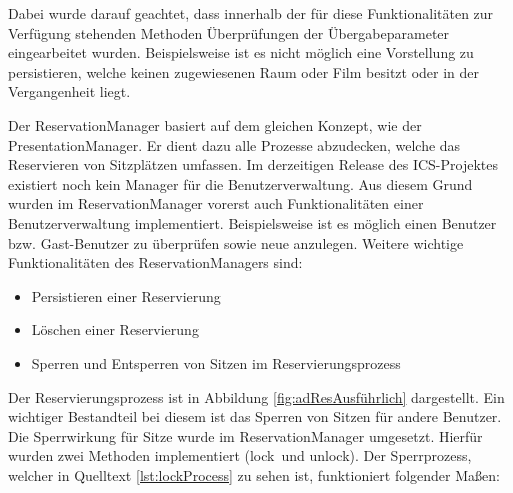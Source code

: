 	Dabei wurde darauf geachtet, dass innerhalb der für diese Funktionalitäten zur Verfügung stehenden Methoden Überprüfungen der Übergabeparameter eingearbeitet wurden. Beispielsweise ist es nicht möglich eine Vorstellung zu persistieren, welche keinen zugewiesenen Raum oder Film besitzt oder in der Vergangenheit liegt.
	
	Der ReservationManager basiert auf dem gleichen Konzept, wie der PresentationManager. Er dient dazu alle Prozesse abzudecken, welche das Reservieren von Sitzplätzen umfassen. Im derzeitigen Release des \ac{ICS}-Projektes existiert noch kein Manager für die Benutzerverwaltung. Aus diesem Grund wurden im ReservationManager vorerst auch Funktionalitäten einer Benutzerverwaltung implementiert. Beispielsweise ist es möglich einen Benutzer bzw. Gast-Benutzer zu überprüfen sowie neue anzulegen. Weitere wichtige Funktionalitäten des ReservationManagers sind: 
	
	\begin{itemize}
		\setlength\itemsep{-0.5em}
		\item Persistieren einer Reservierung
		\item Löschen einer Reservierung
		\item Sperren und Entsperren von Sitzen im Reservierungsprozess
	\end{itemize}
	
	Der Reservierungsprozess ist in Abbildung \ref{fig:adResAusführlich} dargestellt. Ein wichtiger Bestandteil bei diesem ist das Sperren von Sitzen für andere Benutzer. Die Sperrwirkung für Sitze wurde im ReservationManager umgesetzt. Hierfür wurden zwei Methoden implementiert (\glqq lock\grqq \, und \glqq unlock\grqq). Der Sperrprozess, welcher in Quelltext \ref{lst:lockProcess} zu sehen ist, funktioniert folgender Maßen:
	
